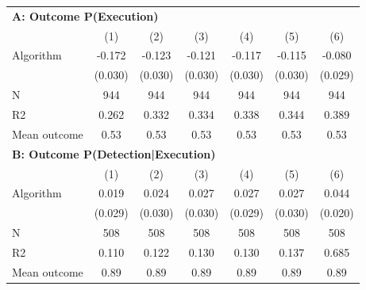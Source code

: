\begin{tabular}{lcccccc} \toprule
\multicolumn{7}{l}{\textbf{A: Outcome P(Execution)}} \\ \multicolumn{1}{l}{} & (1) & (2) & (3) & (4) & (5) & (6) \\ \midrule
Algorithm   &      -0.172\sym{***}&      -0.123\sym{***}&      -0.121\sym{***}&      -0.117\sym{***}&      -0.115\sym{***}&      -0.080\sym{***}\\
            &     (0.030)         &     (0.030)         &     (0.030)         &     (0.030)         &     (0.030)         &     (0.029)         \\
\midrule
N           &         944         &         944         &         944         &         944         &         944         &         944         \\
R2          &       0.262         &       0.332         &       0.334         &       0.338         &       0.344         &       0.389         \\
Mean outcome&        0.53         &        0.53         &        0.53         &        0.53         &        0.53         &        0.53         \\

\midrule \multicolumn{7}{l}{\textbf{B: Outcome P(Detection|Execution)}} \\ \multicolumn{1}{l}{} & (1) & (2) & (3) & (4) & (5) & (6) \\ \midrule
Algorithm   &       0.019         &       0.024         &       0.027         &       0.027         &       0.027         &       0.044\sym{**} \\
            &     (0.029)         &     (0.030)         &     (0.030)         &     (0.029)         &     (0.030)         &     (0.020)         \\
\midrule
N           &         508         &         508         &         508         &         508         &         508         &         508         \\
R2          &       0.110         &       0.122         &       0.130         &       0.130         &       0.137         &       0.685         \\
Mean outcome&        0.89         &        0.89         &        0.89         &        0.89         &        0.89         &        0.89         \\


\end{tabular}
